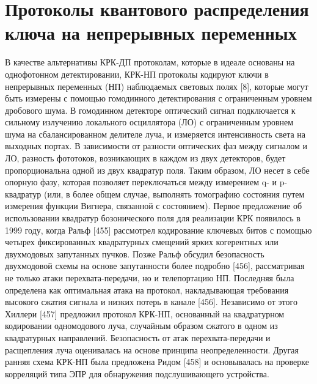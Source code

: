 \section{Протоколы квантового распределения ключа на непрерывных переменных}\label{sec:ch1/CV-QKD review}
В качестве альтернативы КРК-ДП протоколам, которые в идеале основаны на однофотонном детектировании, КРК-НП протоколы кодируют ключи в непрерывных переменных (НП) наблюдаемых световых полях [8], которые могут быть измерены с помощью гомодинного детектирования с ограниченным уровнем дробового шума. В гомодинном детекторе оптический сигнал подключается к сильному излучению локального осциллятора (ЛО) с ограниченным уровнем шума на сбалансированном делителе луча, и измеряется интенсивность света на выходных портах. В зависимости от разности оптических фаз между сигналом и ЛО, разность фототоков, возникающих в каждом из двух детекторов, будет пропорциональна одной из двух квадратур поля. Таким образом, ЛО несет в себе опорную фазу, которая позволяет переключаться между измерением q- и p-квадратур (или, в более общем случае, выполнять томографию состояния путем измерения функции Вигнера, связанной с состоянием).
Первое предложение об использовании квадратур бозонического поля для реализации КРК появилось в 1999 году, когда Ральф [455] рассмотрел кодирование ключевых битов с помощью четырех фиксированных квадратурных смещений ярких когерентных или двухмодовых запутанных пучков. Позже Ральф обсудил безопасность двухмодовой схемы на основе запутанности более подробно [456], рассматривая не только атаки перехвата-передачи, но и телепортацию НП. Последняя была определена как оптимальная атака на протокол, накладывающая требования высокого сжатия сигнала и низких потерь в канале [456]. Независимо от этого Хиллери [457] предложил протокол КРК-НП, основанный на квадратурном кодировании одномодового луча, случайным образом сжатого в одном из квадратурных направлений. Безопасность от атак перехвата-передачи и расщепления луча оценивалась на основе принципа неопределенности. Другая ранняя схема КРК-НП была предложена Ридом [458] и основывалась на проверке корреляций типа ЭПР для обнаружения подслушивающего устройства.
